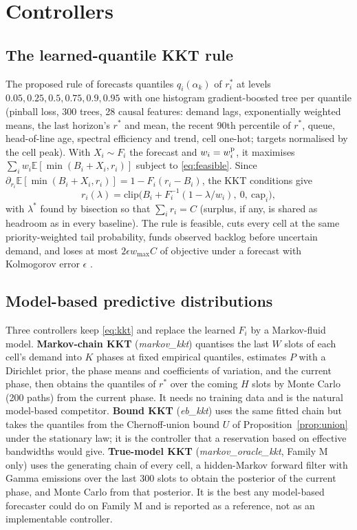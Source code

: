 \documentclass[journal]{IEEEtran}
\newcommand{\rstar}{r^{\ast}}
\newcommand{\E}{\mathbb{E}}
\begin{document}
\section{Controllers}
\label{sec:controllers}
\subsection{The learned-quantile KKT rule}
\label{sec:kkt}
The proposed rule of \cite{ncc2027} forecasts quantiles $q_i(\alpha_k)$ of $\rstar_i$ at levels $0.05, 0.25, 0.5, 0.75, 0.9, 0.95$ with one histogram gradient-boosted tree per quantile (pinball loss, 300 trees, 28 causal features: demand lags, exponentially weighted means, the last horizon's $\rstar$ and mean, the recent 90th percentile of $\rstar$, queue, head-of-line age, spectral efficiency and trend, cell one-hot; targets normalised by the cell peak). With $X_i \sim F_i$ the forecast and $w_i = w_i^{\rm p}$, it maximises $\sum_i w_i\E[\min(B_i + X_i, r_i)]$ subject to \eqref{eq:feasible}. Since $\partial_{r_i}\E[\min(B_i + X_i, r_i)] = 1 - F_i(r_i - B_i)$, the KKT conditions give
\begin{equation}
r_i(\lambda) = \mathrm{clip}\big(B_i + F_i^{-1}(1 - \lambda/w_i),\ 0,\ \mathrm{cap}_i\big),
\label{eq:kkt}
\end{equation}
with $\lambda^\ast$ found by bisection so that $\sum_i r_i = C$ (surplus, if any, is shared as headroom as in every baseline). The rule is feasible, cuts every cell at the same priority-weighted tail probability, funds observed backlog before uncertain demand, and loses at most $2\epsilon w_{\max}C$ of objective under a forecast with Kolmogorov error $\epsilon$ \cite{ncc2027}.

\subsection{Model-based predictive distributions}
Three controllers keep \eqref{eq:kkt} and replace the learned $F_i$ by a Markov-fluid model.
\textbf{Markov-chain KKT} (\emph{markov\_kkt}) quantises the last $W$ slots of each cell's demand into $K$ phases at fixed empirical quantiles, estimates $P$ with a Dirichlet prior, the phase means and coefficients of variation, and the current phase, then obtains the quantiles of $\rstar$ over the coming $H$ slots by Monte Carlo (200 paths) from the current phase. It needs no training data and is the natural model-based competitor. \textbf{Bound KKT} (\emph{eb\_kkt}) uses the same fitted chain but takes the quantiles from the Chernoff-union bound $U$ of Proposition~\ref{prop:union} under the stationary law; it is the controller that a reservation based on effective bandwidths would give. \textbf{True-model KKT} (\emph{markov\_oracle\_kkt}, Family M only) uses the generating chain of every cell, a hidden-Markov forward filter with Gamma emissions over the last 300 slots to obtain the posterior of the current phase, and Monte Carlo from that posterior. It is the best any model-based forecaster could do on Family M and is reported as a reference, not as an implementable controller.
\end{document}
